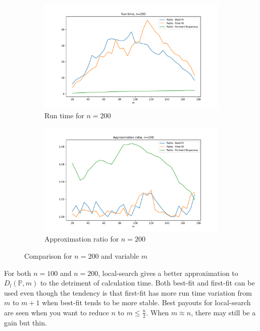 \documentclass{amsart}
\begin{document}
\begin{figure}[ht]
    \centering
    \begin{subfigure}[b]{0.45\textwidth}
        \centering
        \includegraphics[width=\textwidth]{plots/run time 200.pdf}
        \caption{Run time for $n=200$}
    \end{subfigure}
    \hfill
    \begin{subfigure}[b]{0.45\textwidth}
        \centering
        \includegraphics[width=\textwidth]{plots/ratio 200.pdf}
        \caption{Approximation ratio for $n=200$}
    \end{subfigure}
    \caption{Comparison for $n=200$ and variable $m$}
    \label{improvement ratio }
\end{figure}

For both $n=100$ and $n=200$, local-search gives a better approximation to $D_l\left(\mathbb{P},m\right)$ to the detriment of calculation time. Both best-fit and first-fit can be used even though the tendency is that first-fit has more run time variation from $m$ to $m+1$ when best-fit tends to be more stable. Best payouts for local-search are seen when you want to reduce $n$ to $m\leq\frac{n}{2}$. When $m\approx n$, there may still be a gain but thin. 
\clearpage
\end{document}
